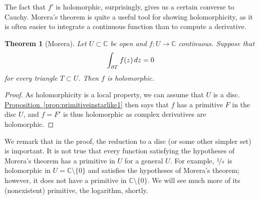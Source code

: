 \documentclass[12pt,openany]{book}
\newcommand{\avoidbreak}{\postdisplaypenalty=100}
\newcommand{\C}{{\mathbb{C}}}
\theoremstyle{plain}
\newtheorem{thm}{Theorem}[section]
\theoremstyle{remark}
\theoremstyle{definition}
\theoremstyle{exercise}
\theoremstyle{example}
\newcommand{\propref}[1]{\hyperref[#1]{Proposition~\ref*{#1}}}
\begin{document}
The fact that $f'$ is holomorphic, surprisingly, gives us a
certain converse to Cauchy.
Morera's theorem is quite a useful tool for showing
holomorphicity, as it is often easier to integrate a continuous
function than to compute a derivative.

\begin{thm}[Morera]
%
\label{thm:Morera}%
Let $U \subset \C$ be open and $f \colon U \to \C$ continuous.
Suppose that
\begin{equation*}
\int_{\partial T} f(z) \, dz = 0
\avoidbreak
\end{equation*}
for every triangle $T \subset U$.  Then $f$ is holomorphic.
\end{thm}

\begin{proof}
As holomorphicity is a local property, we can assume that $U$ is a disc.
\propref{prop:primitiveinstarlike1} then says that $f$ has
a primitive $F$ in the disc $U$, and $f = F'$ is thus holomorphic
as complex derivatives are holomorphic.
\end{proof}

We remark that in the proof,
the reduction to a disc (or some other simpler set)
is important.  It is not true
that every function satisfying the hypotheses of Morera's theorem has a
primitive in $U$ for a general $U$.  For example, $\nicefrac{1}{z}$ is
holomorphic in $U = \C \setminus \{ 0 \}$ and satisfies the hypotheses of
Morera's theorem; however, it does not have a primitive
in $\C \setminus \{ 0 \}$.  We will see much
more of its (nonexistent) primitive, the logarithm, shortly.
\end{document}
